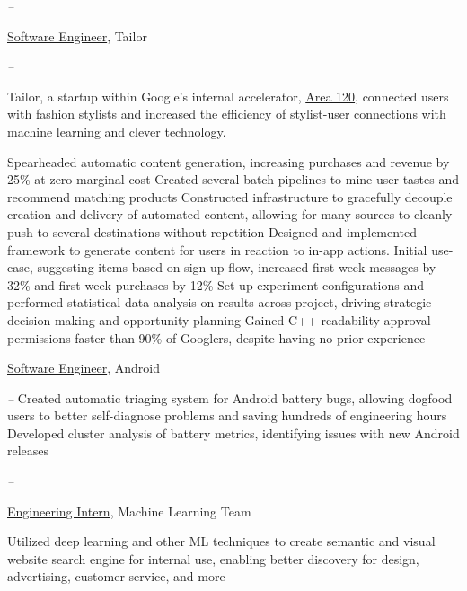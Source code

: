 \documentclass[letterpaper,nonstopmode]{simpleresumecv}
\begin{document}
\begin{Body}
\Entry
{}
\hfill \textit{ -- }
\SmallGap
\begin{Position}\underline{Software Engineer}, Tailor\end{Position}
\hfill \textit{ -- }
\Gap
\begin{Detail} Tailor, a startup within Google's internal accelerator, \href{http://area120.google.com}{Area 120}, connected users with fashion stylists and increased the efficiency of stylist-user connections with machine learning and clever technology.
\end{Detail}
\SmallGap
\BulletItem Spearheaded automatic content generation, increasing purchases and revenue by 25\% at zero marginal cost
\SubBulletItem Created several batch pipelines to mine user tastes and recommend matching products
\SubBulletItem Constructed infrastructure to gracefully decouple creation and delivery of automated content, allowing for many sources to cleanly push to several destinations without repetition 
\BulletItem Designed and implemented framework to generate content for users in reaction to in-app actions. Initial use-case, suggesting items based on sign-up flow, increased first-week messages by 32\% and first-week purchases by 12\%
\BulletItem Set up experiment configurations and performed statistical data analysis on results across project, driving strategic decision making and opportunity planning
\BulletItem Gained C++ readability approval permissions faster than 90\% of Googlers, despite having no prior experience

\Gap
\begin{Position}\underline{Software Engineer}, Android\end{Position}
\hfill \textit{ -- }
\SmallGap
\BulletItem Created automatic triaging system for Android battery bugs, allowing dogfood users to better self-diagnose problems and saving hundreds of engineering hours
\BulletItem Developed cluster analysis of battery metrics, identifying issues with new Android releases

\BigGap
\Entry
{}
\hfill \textit{ -- }
\SmallGap
\begin{Position}\underline{Engineering Intern}, Machine Learning Team\end{Position}
\SmallGap
\BulletItem Utilized deep learning and other ML techniques to create semantic and visual website search engine for internal use, enabling better discovery for design, advertising, customer service, and more


\end{Body}
\end{document}
